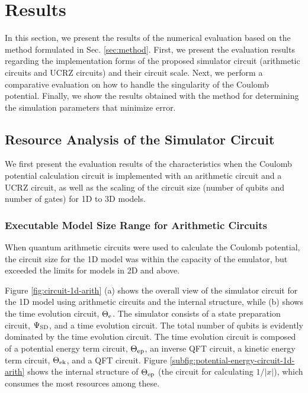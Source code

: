 \documentclass[aip-draft.tex]{subfiles}
\begin{document}
\section{Results}
In this section, we present the results of the numerical evaluation based on the
method formulated in Sec. \ref{sec:method}. First, we present the evaluation results regarding
the implementation forms of the proposed simulator circuit (arithmetic circuits
and UCRZ circuits) and their circuit scale. Next, we perform a comparative
evaluation on how to handle the singularity of the Coulomb potential. Finally,
we show the results obtained with the method for determining the simulation
parameters that minimize error.

\subsection{Resource Analysis of the Simulator Circuit}
\label{subsec:circuit-configuration-results}
We first present the evaluation results of the characteristics when the Coulomb
potential calculation circuit is implemented with an arithmetic circuit and a
UCRZ circuit, as well as the scaling of the circuit size (number of qubits and
number of gates) for 1D to 3D models.

\subsubsection{Executable Model Size Range for Arithmetic Circuits}
\label{subsubsec:arithmetic-circuit-configuration-results}
When quantum arithmetic circuits were used to calculate the Coulomb potential,
the circuit size for the 1D model was within the capacity of the emulator, but
exceeded the limits for models in 2D and above.

Figure \ref{fig:circuit-1d-arith} (a) shows the overall view of the simulator
circuit for the 1D model using arithmetic circuits and the internal structure,
while (b) shows the time evolution circuit, $\Theta_{\mathrm{e}}$. The simulator consists of
a state preparation circuit, $\Psi_{\mathrm{SD}}$, and a time evolution circuit. The total
number of qubits is evidently dominated by the time evolution circuit. The time
evolution circuit is composed of a potential energy term circuit, $\Theta_{\mathrm{ep}}$, an
inverse QFT circuit, a kinetic energy term circuit, $\Theta_{\mathrm{ek}}$, and a QFT
circuit. Figure \ref{subfig:potential-energy-circuit-1d-arith} shows the
internal structure of $\Theta_{\mathrm{ep}}$ (the circuit for calculating $1/|x|$), which
consumes the most resources among these.
\end{document}
